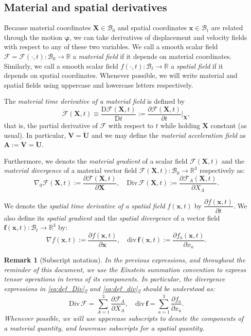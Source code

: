 \documentclass{sfuthesis}
\numberwithin{equation}{section}
\numberwithin{figure}{chapter}
\numberwithin{table}{chapter}
\newtheorem{remark}[theorem]{Remark}
\theoremstyle{definition}
\def\*#1{{\mathbf{#1}}} %
\newcommand{\pder}[2]{\dfrac{\partial #1}{\partial #2}}
\newcommand{\Dder}[2]{\dfrac{\mathrm{D} #1}{\mathrm{D} #2}}
\newcommand{\divs}[1]{{\mathrm{div} \, #1}}
\newcommand{\Divs}[1]{{\mathrm{Div} \, #1}}
\newcommand{\R}{\mathbb{R}}
\newcommand{\B}{\mathcal{B}}
\newcommand{\F}{\mathcal{F}}
\newcommand{\FF}{{\bm{\mathcal{F}}}}
\def\bphi{{\bm{\varphi}}}
\begin{document}
\subsection{Material and spatial derivatives}

Because material coordinates $\*X \in \B_0$ and spatial coordinates $\*x \in \B_t$ are related through the motion $\bphi$, we can take derivatives of displacement and velocity fields with respect to any of these two variables. We call a smooth scalar field $\mathcal{F} = \mathcal{F}(\cdot,t):\B_0 \to \R$ a \textit{material field} if it depends on material coordinates. Similarly, we call a smooth scalar field $f(\cdot,t):\B_t \to \R$ a \textit{spatial field} if it depends on spatial coordinates. Whenever possible, we will write material and spatial fields using uppercase and lowercase letters respectively.

The \textit{material time derivative of a material field} is defined by
\begin{equation}
\dot{\F}(\*X,t) \equiv \Dder{\F(\*X,t)}{t} := \pder{\F(\*X,t)}{t} \bigg|_{\*X},
\end{equation}
that is, the partial derivative of $\F$ with respect to $t$ while holding $\*X$ constant (as usual). In particular, $\*V = \dot{\*U}$ and we may define the \textit{material acceleration field} as $\*A := \dot{\*V} = \ddot{\*U}$.

Furthermore, we denote the \textit{material gradient} of a scalar field $\F(\*X,t)$ and the \textit{material divergence} of a material vector field $\FF(\*X,t):\B_0 \to \R^3$ respectively as:
\begin{equation} \label{eq:def_Div}
\nabla_0 \F(\*X,t) := \pder{\F(\*X,t)}{\*X}, \quad \Divs{\FF(\*X,t)} := \pder{\F_A(\*X,t)}{X_A}.
\end{equation}

We denote the \textit{spatial time derivative of a spatial field} $f(\*x,t)$ by $\pder{f(\*x,t)}{t}$. We also define its \textit{spatial gradient} and the \textit{spatial divergence} of a vector field $\*f(\*x,t):\B_t \to \R^3$ by:
\begin{equation} \label{eq:def_div}
\nabla f(\*x,t) := \pder{f(\*x,t)}{\*x}, \quad \divs{\*f(\*x,t)} := \pder{f_a(\*x,t)}{x_a}.
\end{equation}

\begin{remark}[Subscript notation] \label{re:subscript_notation}
    In the previous expressions, and throughout the reminder of this document, we use the Einstein summation convention to express tensor operations in terms of its components. In particular, the divergence expressions in \eqref{eq:def_Div}\textsubscript{2} and \eqref{eq:def_div}\textsubscript{2} should be understood as:
    \[
        \Divs{\FF} = \sum_{A = 1}^3 \pder{\F_A}{X_A}, \quad \divs{\*f} = \sum_{a=1}^3 \pder{f_a}{x_a}.
    \]
    Whenever possible, we will use uppercase subscripts to denote the components of a material quantity, and lowercase subscripts for a spatial quantity.
\end{remark}
\end{document}
